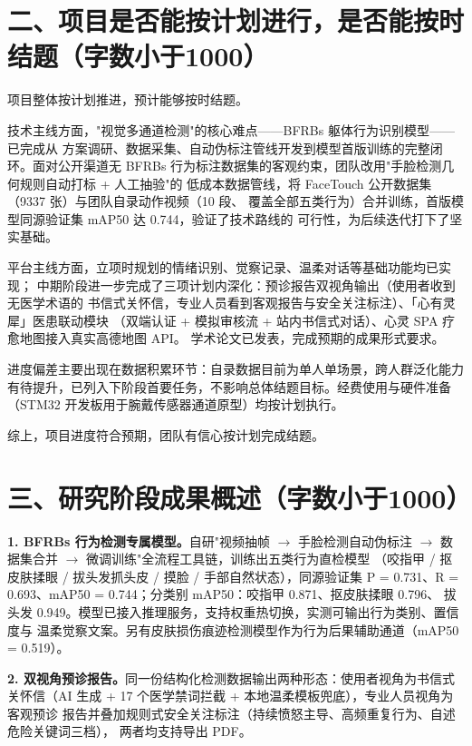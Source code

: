 \documentclass[12pt, a4paper]{ctexart}
\begin{document}
\section*{二、项目是否能按计划进行，是否能按时结题（字数小于1000）}

项目整体按计划推进，预计能够按时结题。

技术主线方面，"视觉多通道检测"的核心难点——BFRBs 躯体行为识别模型——已完成从
方案调研、数据采集、自动伪标注管线开发到模型首版训练的完整闭环。面对公开渠道无
BFRBs 行为标注数据集的客观约束，团队改用"手脸检测几何规则自动打标 + 人工抽验"的
低成本数据管线，将 FaceTouch 公开数据集（9337 张）与团队自录动作视频（10 段、
覆盖全部五类行为）合并训练，首版模型同源验证集 mAP50 达 0.744，验证了技术路线的
可行性，为后续迭代打下了坚实基础。

平台主线方面，立项时规划的情绪识别、觉察记录、温柔对话等基础功能均已实现；
中期阶段进一步完成了三项计划内深化：预诊报告双视角输出（使用者收到无医学术语的
书信式关怀信，专业人员看到客观报告与安全关注标注）、「心有灵犀」医患联动模块
（双端认证 + 模拟审核流 + 站内书信式对话）、心灵 SPA 疗愈地图接入真实高德地图 API。
学术论文已发表，完成预期的成果形式要求。

进度偏差主要出现在数据积累环节：自录数据目前为单人单场景，跨人群泛化能力
有待提升，已列入下阶段首要任务，不影响总体结题目标。经费使用与硬件准备
（STM32 开发板用于腕戴传感器通道原型）均按计划执行。

综上，项目进度符合预期，团队有信心按计划完成结题。

\section*{三、研究阶段成果概述（字数小于1000）}

\textbf{1. BFRBs 行为检测专属模型。}自研"视频抽帧 $\rightarrow$ 手脸检测自动伪标注
$\rightarrow$ 数据集合并 $\rightarrow$ 微调训练"全流程工具链，训练出五类行为直检模型
（咬指甲 / 抠皮肤揉眼 / 拔头发抓头皮 / 摸脸 / 手部自然状态），同源验证集
P = 0.731、R = 0.693、mAP50 = 0.744；分类别 mAP50：咬指甲 0.871、抠皮肤揉眼 0.796、
拔头发 0.949。模型已接入推理服务，支持权重热切换，实测可输出行为类别、置信度与
温柔觉察文案。另有皮肤损伤痕迹检测模型作为行为后果辅助通道（mAP50 = 0.519）。

\textbf{2. 双视角预诊报告。}同一份结构化检测数据输出两种形态：使用者视角为书信式
关怀信（AI 生成 + 17 个医学禁词拦截 + 本地温柔模板兜底），专业人员视角为客观预诊
报告并叠加规则式安全关注标注（持续愤怒主导、高频重复行为、自述危险关键词三档），
两者均支持导出 PDF。
\end{document}

